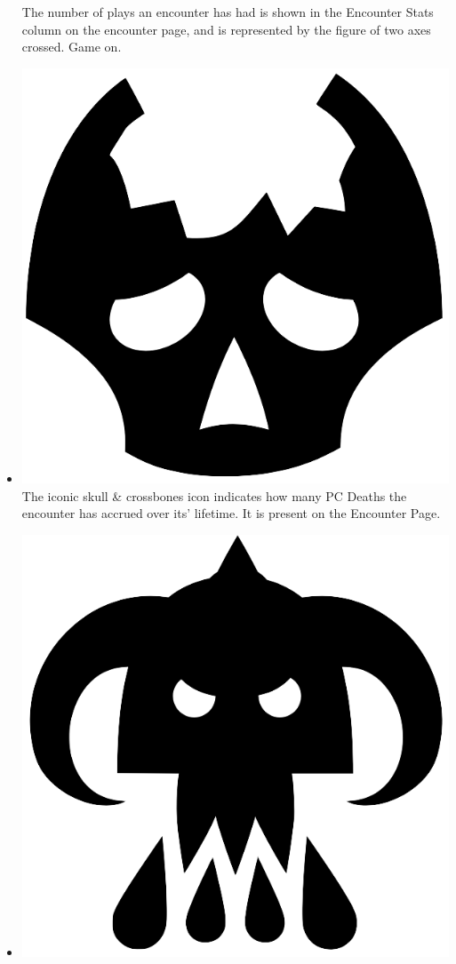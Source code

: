 \documentclass[12pt,a4paper]{report}
\begin{document}
\begin{itemize}
		The number of plays an encounter has had is shown in the Encounter Stats column on the encounter page, and is represented by the figure of two axes crossed. Game on.
		\item \includegraphics[scale=.03]{pc_deaths}
		The iconic skull \& crossbones icon indicates how many PC Deaths the encounter has accrued over its' lifetime. It is present on the Encounter Page.
		\item \includegraphics[scale=.03]{npc_deaths}

\end{itemize}
\end{document}
